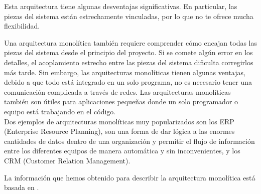 Esta arquitectura tiene algunas desventajas significativas. En particular, las piezas del sistema están estrechamente vinculadas, por lo que no te ofrece mucha flexibilidad.

Una arquitectura monolítica también requiere comprender cómo encajan todas las piezas del sistema desde el principio del proyecto. Si se comete algún error en los detalles, el acoplamiento estrecho entre las piezas del sistema dificulta corregirlos más tarde.
Sin embargo, las arquitecturas monolíticas tienen algunas ventajas, debido a que todo está integrado en un solo programa, no es necesario tener una comunicación complicada a través de redes.
Las arquitecturas monolíticas también son útiles para aplicaciones pequeñas donde un solo programador o equipo está trabajando en el código.\\

Dos ejemplos de arquitecturas monolíticas muy popularizados son los ERP (Enterprise Resource Planning), son una forma de dar lógica a las enormes cantidades de datos dentro de una organización y permitir el flujo de información entre los diferentes equipos de manera automática y sin inconvenientes, y los CRM (Customer Relation Management).

La información que hemos obtenido para describir la arquitectura monolítica está basada en \cite{stephens2015beginning}.
